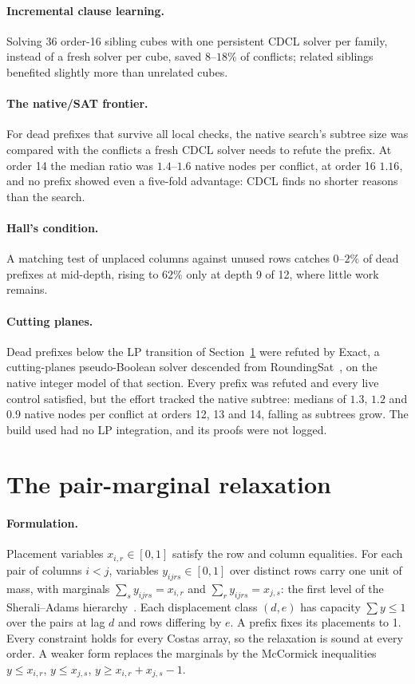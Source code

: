\documentclass[11pt,a4paper,oneside]{report}
\theoremstyle{definition}
\begin{document}
\paragraph{Incremental clause learning.} Solving 36 order-16 sibling cubes with one persistent CDCL solver
per family, instead of a fresh solver per cube, saved $8$--$18\%$ of conflicts; related siblings benefited
slightly more than unrelated cubes.

\paragraph{The native/SAT frontier.} For dead prefixes that survive all local checks, the native search's
subtree size was compared with the conflicts a fresh CDCL solver needs to refute the prefix. At order 14 the
median ratio was $1.4$--$1.6$ native nodes per conflict, at order 16 $1.16$, and no prefix showed even a
five-fold advantage: CDCL finds no shorter reasons than the search.

\paragraph{Hall's condition.} A matching test of unplaced columns against unused rows catches $0$--$2\%$ of dead
prefixes at mid-depth, rising to $62\%$ only at depth 9 of 12, where little work remains.

\paragraph{Cutting planes.} Dead prefixes below the LP transition of Section~\ref{p10-sec:lp} were refuted by Exact,
a cutting-planes pseudo-Boolean solver descended from RoundingSat~\cite{p10-elffers2018}, on the native
integer model of that section. Every prefix was refuted and every live control satisfied, but the effort
tracked the native subtree: medians of $1.3$, $1.2$ and $0.9$ native nodes per conflict at orders 12, 13 and
14, falling as subtrees grow. The build used had no LP integration, and its proofs were not logged.

\section{The pair-marginal relaxation}
\label{p10-sec:lp}
\paragraph{Formulation.} Placement variables $x_{i,r}\in[0,1]$ satisfy the row and column equalities. For each
pair of columns $i<j$, variables $y_{ijrs}\in[0,1]$ over distinct rows carry one unit of mass, with marginals
$\sum_s y_{ijrs}=x_{i,r}$ and $\sum_r y_{ijrs}=x_{j,s}$: the first level of the Sherali--Adams
hierarchy~\cite{p10-sherali1990}. Each displacement class $(d,e)$ has capacity $\sum y\le1$ over the pairs at
lag $d$ and rows differing by $e$. A prefix fixes its placements to 1. Every constraint holds for every
Costas array, so the relaxation is sound at every order. A weaker form replaces the marginals by the
McCormick inequalities $y\le x_{i,r}$, $y\le x_{j,s}$, $y\ge x_{i,r}+x_{j,s}-1$.
\end{document}
